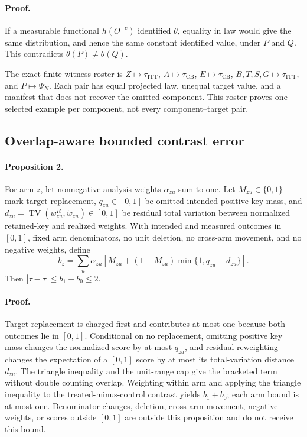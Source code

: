 \documentclass{article}
\begin{document}
\paragraph{Proof.}
If a measurable functional $h(O^{-c})$ identified $\theta$, equality in law would give the same distribution, and hence the same constant identified value, under $P$ and $Q$. This contradicts $\theta(P)\ne\theta(Q)$.

The exact finite witness roster is $Z\mapsto\tau_{\mathrm{ITT}}$, $A\mapsto\tau_{\mathrm{CB}}$, $E\mapsto\tau_{\mathrm{CB}}$, $B,T,S,G\mapsto\tau_{\mathrm{ITT}}$, and $P\mapsto\Psi_N$. Each pair has equal projected law, unequal target value, and a manifest that does not recover the omitted component. This roster proves one selected example per component, not every component--target pair.

\subsection{Overlap-aware bounded contrast error}

\paragraph{Proposition 2.}
For arm $z$, let nonnegative analysis weights $\alpha_{zu}$ sum to one. Let $M_{zu}\in\{0,1\}$ mark target replacement, $q_{zu}\in[0,1]$ be omitted intended positive key mass, and $d_{zu}=\operatorname{TV}(w^R_{zu},\widetilde w_{zu})\in[0,1]$ be residual total variation between normalized retained-key and realized weights. With intended and measured outcomes in $[0,1]$, fixed arm denominators, no unit deletion, no cross-arm movement, and no negative weights, define
\begin{equation}
b_z=\sum_u\alpha_{zu}\left[M_{zu}+(1-M_{zu})\min\{1,q_{zu}+d_{zu}\}\right].
\end{equation}
Then $|\widetilde\tau-\tau|\le b_1+b_0\le2$.

\paragraph{Proof.}
Target replacement is charged first and contributes at most one because both outcomes lie in $[0,1]$. Conditional on no replacement, omitting positive key mass changes the normalized score by at most $q_{zu}$, and residual reweighting changes the expectation of a $[0,1]$ score by at most its total-variation distance $d_{zu}$. The triangle inequality and the unit-range cap give the bracketed term without double counting overlap. Weighting within arm and applying the triangle inequality to the treated-minus-control contrast yields $b_1+b_0$; each arm bound is at most one. Denominator changes, deletion, cross-arm movement, negative weights, or scores outside $[0,1]$ are outside this proposition and do not receive this bound.
\end{document}
